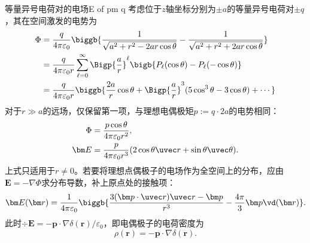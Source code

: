 \begin{example}{等量异号电荷对的电场}{E of pm q}
    考虑位于$z$轴坐标分别为$\pm a$的等量异号电荷对$\pm q$，其在空间激发的电势为
    \begin{align*}
        \Phi&=\frac q{4\pi\varepsilon_0}\biggb{\frac1{\sqrt{a^2+r^2-2ar\cos\theta}}-\frac1{\sqrt{a^2+r^2+2ar\cos\theta}}}\\
        &=\frac q{4\pi\varepsilon_0r}\sum_{\ell=0}^\infty\Bigp{\frac ar}^\ell\bigb{P_{\ell}(\cos\theta)-P_\ell(-\cos\theta)}\\
        &=\frac q{4\pi\varepsilon_0r}\biggb{\frac{2a}r\cos\theta+\Bigp{\frac ar}^3(5\cos^3\theta-3\cos\theta)+\cdots}
    \end{align*}
    对于$r\gg a$的远场，仅保留第一项，与理想电偶极矩$p:=q\cdot 2a$的电势相同：
    \begin{subequations}
        \begin{align}
            \label{eqn:Phi dipole}
            \Phi&=\frac{p\cos\theta}{4\pi\varepsilon_0r^2},\\
            \label{eqn:E dipole}
            \bm E&=\frac p{4\pi\varepsilon_0r^3}(2\cos\theta\uvec r+\sin\theta\uvec\theta).
        \end{align}
    \end{subequations}
    上式只适用于$r\neq0$。若要将理想点偶极子的电场作为全空间上的分布，应由$\bm E=-\nabla\Phi$求分布导数，补上原点处的接触项：
    \begin{equation}
        \label{eqn:E dipole with delta}
        \bm E(\bm r)=\frac1{4\pi\varepsilon_0}\biggb{\frac{3(\bm p\cdot\uvec r)\uvec r-\bm p}{r^3}-\frac{4\pi}3\bm p\vd(\bm r)}.
    \end{equation}
    此时$\div\bm E=-\bm p\cdot\nabla\delta(\bm r)/\varepsilon_0$，即电偶极子的电荷密度为
    \begin{equation}
        \rho(\bm r)=-\bm p\cdot\nabla\delta(\bm r).
    \end{equation}
\end{example}

